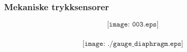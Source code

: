 \documentclass[aspectratio=169,xcolor=dvipsnames]{beamer}
\begin{document}
%
%
%
%
%
%
%
%
\begin{frame}
	\frametitle{Mekaniske trykksensorer}

	$$\texttt{[image: 003.eps]}$$
\end{frame}

%
%
%
%
%
%
\begin{frame}
	\frametitle{}

	$$\texttt{[image: ./gauge\_diaphragm.eps]}$$
\end{frame}
\end{document}
